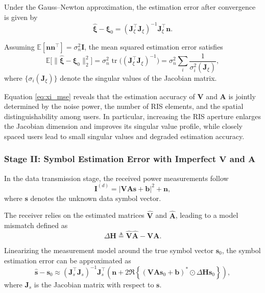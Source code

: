 \documentclass[journal]{IEEEtran}
\begin{document}
Under the Gauss--Newton approximation, the estimation error after convergence is given by
\begin{equation}
\label{eq:xi_error}
\hat{\boldsymbol{\xi}} - \boldsymbol{\xi}_0
=
\left(
\mathbf{J}_{\xi}^\top
\mathbf{J}_{\xi}
\right)^{-1}
\mathbf{J}_{\xi}^\top
\mathbf{n}.
\end{equation}

Assuming $\mathbb{E}[\mathbf{n}\mathbf{n}^\top]=\sigma_n^2 \mathbf{I}$, the mean squared estimation error satisfies
\begin{equation}
\label{eq:xi_mse}
\mathbb{E}
\big[
\|
\hat{\boldsymbol{\xi}}-\boldsymbol{\xi}_0
\|_2^2
\big]
=
\sigma_n^2
\operatorname{tr}
\big(
(\mathbf{J}_{\xi}^\top\mathbf{J}_{\xi})^{-1}
\big)
=
\sigma_n^2
\sum_{i}
\frac{1}{\sigma_i^2(\mathbf{J}_{\xi})},
\end{equation}
where $\{\sigma_i(\mathbf{J}_{\xi})\}$ denote the singular values of the Jacobian matrix.

Equation \eqref{eq:xi_mse} reveals that the estimation accuracy of $\mathbf{V}$ and $\mathbf{A}$ is jointly determined by the noise power, the number of RIS elements, and the spatial distinguishability among users. In particular, increasing the RIS aperture enlarges the Jacobian dimension and improves its singular value profile, while closely spaced users lead to small singular values and degraded estimation accuracy.

\subsubsection{Stage II: Symbol Estimation Error with Imperfect $\mathbf{V}$ and $\mathbf{A}$}

In the data transmission stage, the received power measurements follow
\begin{equation}
\mathbf{I}^{(d)}
=
\left|
\mathbf{V}\mathbf{A}\mathbf{s}
+
\mathbf{b}
\right|^2
+
\mathbf{n},
\end{equation}
where $\mathbf{s}$ denotes the unknown data symbol vector.

The receiver relies on the estimated matrices $\hat{\mathbf{V}}$ and $\hat{\mathbf{A}}$, leading to a model mismatch defined as
\begin{equation}
\Delta\mathbf{H}
\triangleq
\hat{\mathbf{V}}\hat{\mathbf{A}}
-
\mathbf{V}\mathbf{A}.
\end{equation}

Linearizing the measurement model around the true symbol vector $\mathbf{s}_0$, the symbol estimation error can be approximated as
\begin{equation}
\label{eq:s_error}
\hat{\mathbf{s}} - \mathbf{s}_0
\approx
\left(
\mathbf{J}_s^\top
\mathbf{J}_s
\right)^{-1}
\mathbf{J}_s^\top
\left(
\mathbf{n}
+
2\Re\!\left\{
(\mathbf{V}\mathbf{A}\mathbf{s}_0+\mathbf{b})^\ast
\odot
\Delta\mathbf{H}\mathbf{s}_0
\right\}
\right),
\end{equation}
where $\mathbf{J}_s$ is the Jacobian matrix with respect to $\mathbf{s}$.
\end{document}

